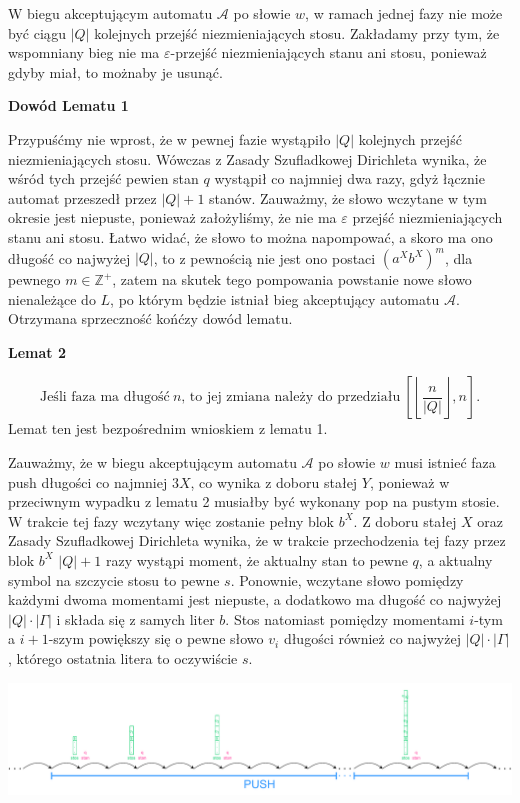 \documentclass[12pt]{article}
\begin{document}
	W biegu akceptującym automatu \(\mathcal{A}\) po słowie \(w\), w ramach
	jednej fazy nie może być ciągu \(\left| Q \right|\) kolejnych przejść
	niezmieniających stosu. Zakładamy przy tym, że wspomniany bieg nie ma
	\(\varepsilon\)-przejść niezmieniających stanu ani stosu, ponieważ gdyby
	miał, to możnaby je usunąć.
	
	\medskip
	
	\textbf{Dowód Lematu 1}
	
	Przypuśćmy nie wprost, że w pewnej fazie wystąpiło \(\left| Q \right|\)
	kolejnych przejść niezmieniających stosu. Wówczas z Zasady Szufladkowej
	Dirichleta wynika, że wśród tych przejść pewien stan \(q\) wystąpił co
	najmniej dwa razy, gdyż łącznie automat przeszedł przez \(\left| Q
	\right| + 1\) stanów. Zauważmy, że słowo wczytane w tym okresie jest
	niepuste, ponieważ założyliśmy, że nie ma \(\varepsilon\) przejść
	niezmieniających stanu ani stosu. Łatwo widać, że słowo to można napompować,
	a skoro ma ono długość co najwyżej \(\left| Q \right|\), to z pewnością nie
	jest ono postaci \(\left( a^{X} b^{X} \right) ^ m\), dla pewnego \(m \in
	\mathbb{Z}^{+}\), zatem na skutek tego pompowania powstanie nowe słowo
	nienależące do \(L\), po którym będzie istniał bieg akceptujący automatu
	\(\mathcal{A}\). Otrzymana sprzeczność końćzy dowód lematu.
	
	\medskip
	
	\textbf{Lemat 2}
	
	\[ \text{Jeśli faza ma długość} \ n
	\text{, to jej zmiana należy do przedziału} \ \left[ \left\lfloor
	\frac{n}{\left| Q \right|} \right\rfloor, n \right] \text{.} \]
	Lemat ten jest bezpośrednim wnioskiem z lematu 1.
	
	\medskip
	
	Zauważmy, że w biegu akceptującym automatu \(\mathcal{A}\) po słowie \(w\)
	musi istnieć faza push długości co najmniej \(3X\), co wynika z doboru
	stałej \(Y\), ponieważ w przeciwnym wypadku z lematu 2 musiałby być wykonany
	pop na pustym stosie. W trakcie tej fazy wczytany więc zostanie pełny blok
	\(b^{X}\). Z doboru stałej \(X\) oraz Zasady Szufladkowej Dirichleta wynika,
	że w trakcie przechodzenia tej fazy przez blok \(b^{X}\) \(\left| Q \right|
	+ 1\) razy wystąpi moment, że aktualny stan to pewne \(q\), a aktualny
	symbol na szczycie stosu to pewne \(s\). Ponownie, wczytane słowo pomiędzy
	każdymi dwoma momentami jest niepuste, a dodatkowo ma długość co najwyżej
	\(\left| Q \right| \cdot \left| \Gamma \right|\) i składa się z samych liter
	\(b\). Stos natomiast pomiędzy momentami \(i\)-tym a \(i + 1\)-szym
	powiększy się o pewne słowo \(v_{i}\) długości również co najwyżej \(\left|
	Q \right| \cdot \left| \Gamma \right|\), którego ostatnia litera to
	oczywiście \(s\).
	\begin{center}
		\includegraphics[width = 0.9 \textwidth]{./image-1.pdf}
	\end{center}
	
\end{document}

